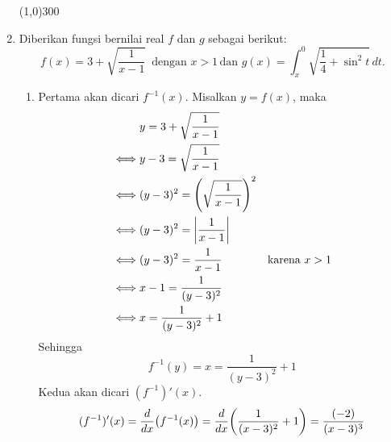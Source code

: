\begin{enumerate}[leftmargin=*, label={\arabic*}.]
\begin{center}
    \line(1,0){300}
\end{center}
\item Diberikan fungsi bernilai real $f$ dan $g$ sebagai berikut:
\[
f(x)=3+\sqrt{\frac{1}{x-1}}\,\text{ dengan }x > 1\,\text{dan }g(x)=
\int_{x}^{0}\sqrt{\frac{1}{4}+\sin^{2}t}\,dt.
\]
\begin{enumerate}[label={\alph*}.]
    \item Pertama akan dicari $f^{-1}(x)$.
    Misalkan $y=f(x)$, maka
    \begin{align*}
        &y = 3+\sqrt{\frac{1}{x-1}}\\
        \iff &y-3 = \sqrt{\frac{1}{x-1}}\\
        \iff &(y-3)^{2} = \brk*{\sqrt{\frac{1}{x-1}}}^2\\
        \iff &(y-3)^{2} = \abs*{\frac{1}{x-1}}\\
        \iff &(y-3)^{2} = \frac{1}{x-1}
        &\text{karena }x>1\\
        \iff &x-1=\frac{1}{(y-3)^{2}}\\
        \iff &x=\frac{1}{(y-3)^{2}}+1
    \end{align*}
    Sehingga
    \[
    f^{-1}(y) = x = \frac{1}{(y-3)^{2}}+1
    \]
    Kedua akan dicari $(f^{-1})'(x)$.
    \[
        (f^{-1})'(x) = \drv{x}{f^{-1}(x)}
        = \drv{x}{\frac{1}{(x-3)^{2}}+1}=\frac{(-2)}{(x-3)^{3}}
    \]


\end{enumerate}
\end{enumerate}
